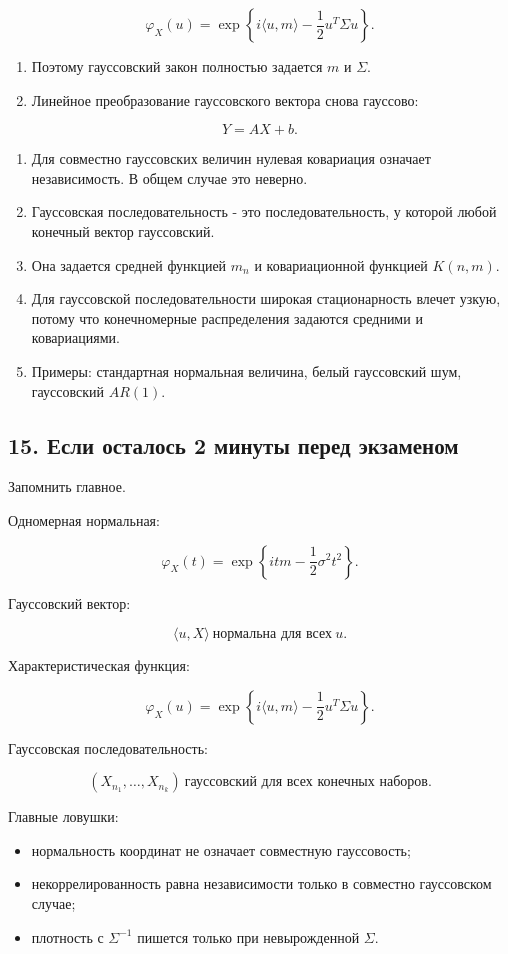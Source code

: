 \documentclass[
  11pt,
  a4paper,
]{article}
\providecommand{\tightlist}{%
  \setlength{\itemsep}{0pt}\setlength{\parskip}{0pt}}
\begin{document}
\[
\varphi_X(u)
=
\exp\left\{i\langle u,m\rangle-\frac12u^T\Sigma u\right\}.
\]

\begin{enumerate}
\def\labelenumi{\arabic{enumi}.}
\setcounter{enumi}{5}
\tightlist
\item
  Поэтому гауссовский закон полностью задается \(m\) и \(\Sigma\).
\item
  Линейное преобразование гауссовского вектора снова гауссово:
\end{enumerate}

\[
Y=AX+b.
\]

\begin{enumerate}
\def\labelenumi{\arabic{enumi}.}
\setcounter{enumi}{7}
\tightlist
\item
  Для совместно гауссовских величин нулевая ковариация означает
  независимость. В общем случае это неверно.
\item
  Гауссовская последовательность - это последовательность, у которой
  любой конечный вектор гауссовский.
\item
  Она задается средней функцией \(m_n\) и ковариационной функцией
  \(K(n,m)\).
\item
  Для гауссовской последовательности широкая стационарность влечет
  узкую, потому что конечномерные распределения задаются средними и
  ковариациями.
\item
  Примеры: стандартная нормальная величина, белый гауссовский шум,
  гауссовский \(AR(1)\).
\end{enumerate}

\subsection{15. Если осталось 2 минуты перед
экзаменом}\label{ux435ux441ux43bux438-ux43eux441ux442ux430ux43bux43eux441ux44c-2-ux43cux438ux43dux443ux442ux44b-ux43fux435ux440ux435ux434-ux44dux43aux437ux430ux43cux435ux43dux43eux43c}

Запомнить главное.

Одномерная нормальная:

\[
\varphi_X(t)=\exp\left\{itm-\frac12\sigma^2t^2\right\}.
\]

Гауссовский вектор:

\[
\langle u,X\rangle\ \text{нормальна для всех}\ u.
\]

Характеристическая функция:

\[
\varphi_X(u)
=
\exp\left\{i\langle u,m\rangle-\frac12u^T\Sigma u\right\}.
\]

Гауссовская последовательность:

\[
(X_{n_1},\ldots,X_{n_k})\ \text{гауссовский для всех конечных наборов}.
\]

Главные ловушки:

\begin{itemize}
\tightlist
\item
  нормальность координат не означает совместную гауссовость;
\item
  некоррелированность равна независимости только в совместно гауссовском
  случае;
\item
  плотность с \(\Sigma^{-1}\) пишется только при невырожденной
  \(\Sigma\).
\end{itemize}

\newpage
\end{document}
